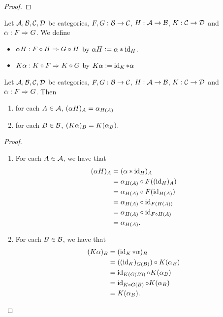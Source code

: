 \documentclass{book}
\begin{document}
	\begin{proof}
	\end{proof}
	
	\begin{defn}  
		Let $\mathcal{A}, \mathcal{B}, \mathcal{C}, \mathcal{D}$ be categories, $F,G: \mathcal{B} \rightarrow \mathcal{C}$, $H:\mathcal{A} \rightarrow \mathcal{B}$, $K: \mathcal{C} \rightarrow \mathcal{D}$ and $\alpha: F \Rightarrow G$. We define 
		\begin{itemize}
			\item $\alpha H: F \circ H \Rightarrow G \circ H$ by $\alpha H \vcentcolon= \alpha * \operatorname{id}_{H}$.
			\item $K \alpha : K \circ F \Rightarrow K \circ G$ by $K \alpha \vcentcolon= \operatorname{id}_K * \alpha$
		\end{itemize}
	\end{defn}
	
	\begin{ex} 
		Let $\mathcal{A}, \mathcal{B}, \mathcal{C}, \mathcal{D}$ be categories, $F,G: \mathcal{B} \rightarrow \mathcal{C}$, $H:\mathcal{A} \rightarrow \mathcal{B}$, $K: \mathcal{C} \rightarrow \mathcal{D}$ and $\alpha: F \Rightarrow G$. Then 
		\begin{enumerate}
			\item for each $A \in \mathcal{A}$, $(\alpha H)_A = \alpha_{H(A)}$
			\item for each $B \in \mathcal{B}$, $(K \alpha)_B = K(\alpha_B)$.
		\end{enumerate}
	\end{ex}
	
	\begin{proof}\
		\begin{enumerate}
			\item For each $A \in \mathcal{A}$, we have that 
			\begin{align*}
				(\alpha H)_A
				& = (\alpha * \operatorname{id}_H)_A \\
				& = \alpha_{H(A)} \circ F((\operatorname{id}_H)_A) \\
				& = \alpha_{H(A)} \circ F(\operatorname{id}_{H(A)}) \\
				& = \alpha_{H(A)} \circ \operatorname{id}_{F(H(A))} \\
				& = \alpha_{H(A)} \circ \operatorname{id}_{F \circ H(A)} \\
				& = \alpha_{H(A)}.
			\end{align*}
			\item 
			For each $B \in \mathcal{B}$, we have that 
			\begin{align*}
				(K \alpha)_B
				& = (\operatorname{id}_K * \alpha)_B \\
				& = ((\operatorname{id}_K)_{G(B)}) \circ K(\alpha_B) \\
				& = \operatorname{id}_{K(G(B))} \circ K(\alpha_B) \\
				& = \operatorname{id}_{K \circ G(B)} \circ K(\alpha_B) \\
				& = K(\alpha_B).
			\end{align*}
		\end{enumerate}
	\end{proof}
	
\end{document}
